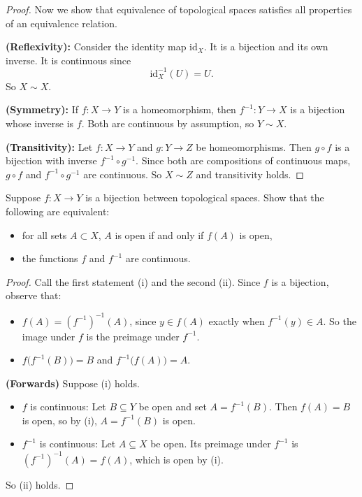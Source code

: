 \documentclass[minion]{homework}
\begin{document}
\begin{problems}
\begin{proof}
Now we show that equivalence of topological spaces satisfies all properties of an equivalence relation.

\textbf{(Reflexivity):} Consider the identity map $\mathrm{id}_X$. It is a bijection and its own inverse. It is continuous since
\[
\mathrm{id}_X^{-1}(U) = U.
\]
So $X \sim X$.

\textbf{(Symmetry):} If $f : X \to Y$ is a homeomorphism, then $f^{-1} : Y \to X$ is a bijection whose inverse is $f$. Both are continuous by assumption, so $Y \sim X$.

\textbf{(Transitivity):} Let $f : X \to Y$ and $g : Y \to Z$ be homeomorphisms. Then $g \circ f$ is a bijection with inverse $f^{-1} \circ g^{-1}$. Since both are compositions of continuous maps, $g \circ f$ and $f^{-1} \circ g^{-1}$ are continuous. So $X \sim Z$ and transitivity holds.
\end{proof}

\problem Suppose $f:X\to Y$ is a bijection between topological spaces.
Show that the following are equivalent:
\begin{itemize}
\item for all sets $A\subset  X$, $A$ is open if and only if $f(A)$ is open,
\item the functions $f$ and $f^{-1}$ are continuous.
\end{itemize}

\begin{proof}
Call the first statement (i) and the second (ii). Since $f$ is a bijection, observe that:
\begin{itemize}
  \item $f(A) = (f^{-1})^{-1}(A)$, since $y \in f(A)$ exactly when $f^{-1}(y) \in A$. So the image under $f$ is the preimage under $f^{-1}$.
  \item $f\big(f^{-1}(B)\big) = B$ and $f^{-1}\big(f(A)\big) = A$.
\end{itemize}

\textbf{(Forwards)} Suppose (i) holds.
\begin{itemize}
  \item $f$ is continuous: Let $B \subseteq Y$ be open and set $A = f^{-1}(B)$. Then $f(A) = B$ is open, so by (i), $A = f^{-1}(B)$ is open.
  \item $f^{-1}$ is continuous: Let $A \subseteq X$ be open. Its preimage under $f^{-1}$ is $(f^{-1})^{-1}(A) = f(A)$, which is open by (i).
\end{itemize}
So (ii) holds.


\end{proof}
\end{problems}
\end{document}
